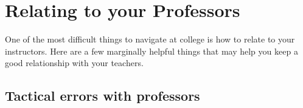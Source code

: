 
\chapter{Relating to your Professors} 

One of the most difficult things to navigate at college is how to relate to your instructors. Here are a few marginally helpful things that may help you keep a good relationship with your teachers.

\section{Tactical errors with professors}

